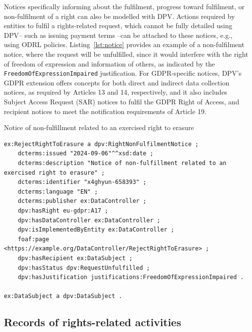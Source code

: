 \documentclass{IOS-Book-Article}     %
\begin{document}
Notices specifically informing about the fulfilment, progress toward fulfilment, or non-fulfilment of a right can also be modelled with DPV.
Actions required by entities to fulfil a rights-related request, which cannot be fully detailed using DPV-- such as issuing payment terms --can be attached to these notices, e.g., using ODRL policies.
Listing~\ref{lst:notice} provides an example of a non-fulfilment notice, where the request will be unfulfilled, since it would interfere with the right of freedom of expression and information of others, as indicated by the \texttt{FreedomOfExpressionImpaired} justification.
For GDPR-specific notices, DPV's GDPR extension offers concepts for both direct and indirect data collection notices, as required by Articles 13 and 14, respectively, and it also includes Subject Access Request (SAR) notices to fulfil the GDPR Right of Access, and recipient notices to meet the notification requirements of Article 19.

\begin{listing}[ht]
\caption{Notice of non-fulfillment related to an exercised right to erasure}
\label{lst:notice}
\begin{verbatim}
ex:RejectRightToErasure a dpv:RightNonFulfilmentNotice ;
    dcterms:issued "2024-09-06"^^xsd:date ;
    dcterms:description "Notice of non-fulfillment related to an exercised right to erasure" ;
    dcterms:identifier "x4ghyun-658393" ;
    dcterms:language "EN" ;
    dcterms:publisher ex:DataController ;
    dpv:hasRight eu-gdpr:A17 ;
    dpv:hasDataController ex:DataController ;
    dpv:isImplementedByEntity ex:DataController ;
    foaf:page <https://example.org/DataController/RejectRightToErasure> ;
    dpv:hasRecipient ex:DataSubject ;
    dpv:hasStatus dpv:RequestUnfulfilled ;
    dpv:hasJustification justifications:FreedomOfExpressionImpaired .

ex:DataSubject a dpv:DataSubject .
\end{verbatim}
\end{listing}

\subsection{Records of rights-related activities}
\label{sec:records}
\end{document}
